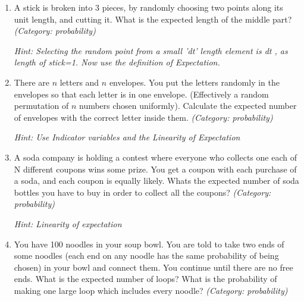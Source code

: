 \begin{enumerate}
\item A stick is broken into 3 pieces, by randomly choosing two points along its unit length, and cutting it. What is the expected length of the middle part?
\small\emph{(Category: probability)}

\small\emph{Hint: Selecting the random point from a small 'dt' length element is dt , as length of stick=1. Now use the definition of Expectation.}





\item There are $n$ letters and $n$ envelopes. You put the letters randomly in the envelopes so that each letter is in one envelope. (Effectively a random permutation of $n$ numbers chosen uniformly). Calculate the expected number of envelopes with the correct letter inside them.
\small\emph{(Category: probability)}

\small\emph{Hint: Use Indicator variables and the Linearity of Expectation}





\item A soda company is holding a contest where everyone who collects one each of N different coupons wins some prize. You get a coupon with each purchase of a soda, and each coupon is equally likely. Whats the expected number of soda bottles you have to buy in order to collect all the coupons?
\small\emph{(Category: probability)}

\small\emph{Hint: Linearity of expectation}





\item You have 100 noodles in your soup bowl. You are told to take two ends of some noodles (each end on any noodle has the same probability of being chosen) in your bowl and connect them. You continue until there are no free ends. What is the expected number of loops? What is the probability of making one large loop which includes every noodle?
\small\emph{(Category: probability)}


\end{enumerate}
